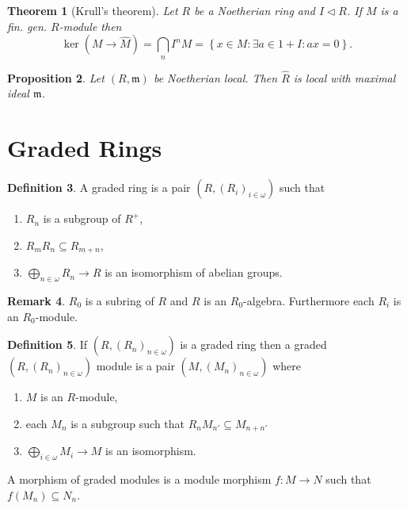 \documentclass{article}
\newcommand{\setwith}[2]{\left\{#1:#2\right\}}
\newcommand{\maxid}{\mathfrak{m}}
\newcommand{\ideal}{\triangleleft}
\newtheorem{theorem}{Theorem}[section]
\newtheorem{proposition}[theorem]{Proposition}
\theoremstyle{definition}
\newtheorem{definition}[theorem]{Definition}
\newtheorem{remark}[theorem]{Remark}
\begin{document}
\begin{theorem}[Krull's theorem]
    Let \(R\) be a Noetherian ring and \(I\ideal R\). If \(M\) is a fin. gen.
    \(R\)-module then
    \[
        \ker(M\to\widehat{M})=\bigcap_{n}I^{n}M=\setwith{x\in M}{\exists a\in 1+I:ax=0}.
    \]
\end{theorem}

\begin{proposition}
    Let \((R,\maxid)\) be Noetherian local. Then \(\widehat{R}\) is local
    with maximal ideal \(\maxid\).
\end{proposition}

\section{Graded Rings}
\begin{definition}
    A graded ring is a pair \((R,(R_{i})_{i\in\omega})\) such that
    \begin{enumerate}
        \item \(R_{n}\) is a subgroup of \(R^{+}\),
        \item \(R_{m}R_{n}\subseteq R_{m+n}\),
        \item \(\bigoplus_{n\in\omega}R_{n}\to R\) is an isomorphism of abelian
              groups.
    \end{enumerate}
\end{definition}

\begin{remark}
    \(R_{0}\) is a subring of \(R\) and \(R\) is an \(R_{0}\)-algebra. Furthermore
    each \(R_{i}\) is an \(R_{0}\)-module.
\end{remark}

\begin{definition}
    If \((R,(R_{n})_{n\in\omega})\) is a graded ring then a graded
    \((R,(R_{n})_{n\in\omega})\) module is a pair \((M,(M_{n})_{n\in\omega})\)
    where
    \begin{enumerate}
        \item \(M\) is an \(R\)-module,
        \item each \(M_{n}\) is a subgroup such that \(R_{n}M_{n'}\subseteq
              M_{n+n'}\)
        \item \(\bigoplus_{i\in\omega}M_{i}\to M\) is an isomorphism.
    \end{enumerate}
    A morphism of graded modules is a module morphism \(f:M\to N\)
    such that \(f(M_{n})\subseteq N_{n}\).
\end{definition}
\end{document}
